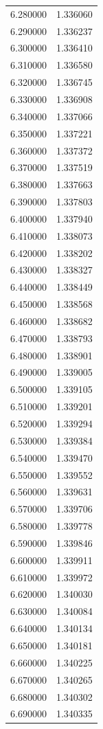 \begin{tabular}{rr}
6.280000 & 1.336060 \\
6.290000 & 1.336237 \\
6.300000 & 1.336410 \\
6.310000 & 1.336580 \\
6.320000 & 1.336745 \\
6.330000 & 1.336908 \\
6.340000 & 1.337066 \\
6.350000 & 1.337221 \\
6.360000 & 1.337372 \\
6.370000 & 1.337519 \\
6.380000 & 1.337663 \\
6.390000 & 1.337803 \\
6.400000 & 1.337940 \\
6.410000 & 1.338073 \\
6.420000 & 1.338202 \\
6.430000 & 1.338327 \\
6.440000 & 1.338449 \\
6.450000 & 1.338568 \\
6.460000 & 1.338682 \\
6.470000 & 1.338793 \\
6.480000 & 1.338901 \\
6.490000 & 1.339005 \\
6.500000 & 1.339105 \\
6.510000 & 1.339201 \\
6.520000 & 1.339294 \\
6.530000 & 1.339384 \\
6.540000 & 1.339470 \\
6.550000 & 1.339552 \\
6.560000 & 1.339631 \\
6.570000 & 1.339706 \\
6.580000 & 1.339778 \\
6.590000 & 1.339846 \\
6.600000 & 1.339911 \\
6.610000 & 1.339972 \\
6.620000 & 1.340030 \\
6.630000 & 1.340084 \\
6.640000 & 1.340134 \\
6.650000 & 1.340181 \\
6.660000 & 1.340225 \\
6.670000 & 1.340265 \\
6.680000 & 1.340302 \\
6.690000 & 1.340335 \\

\end{tabular}
